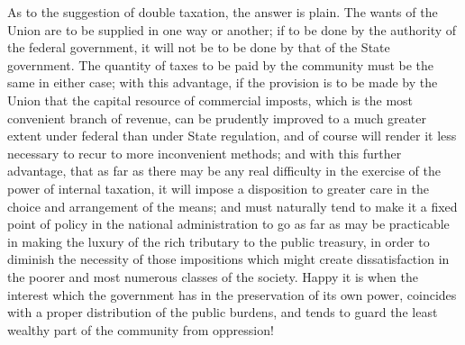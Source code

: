 As to the suggestion of double taxation, the answer is plain. The wants of the Union are to be supplied in one way or another; if to be done by the authority of the federal government, it will not be to be done by that of the State government. The quantity of taxes to be paid by the community must be the same in either case; with this advantage, if the provision is to be made by the Union that the capital resource of commercial imposts, which is the most convenient branch of revenue, can be prudently improved to a much greater extent under federal than under State regulation, and of course will render it less necessary to recur to more inconvenient methods; and with this further advantage, that as far as there may be any real difficulty in the exercise of the power of internal taxation, it will impose a disposition to greater care in the choice and arrangement of the means; and must naturally tend to make it a fixed point of policy in the national administration to go as far as may be practicable in making the luxury of the rich tributary to the public treasury, in order to diminish the necessity of those impositions which might create dissatisfaction in the poorer and most numerous classes of the society. Happy it is when the interest which the government has in the preservation of its own power, coincides with a proper distribution of the public burdens, and tends to guard the least wealthy part of the community from oppression!

